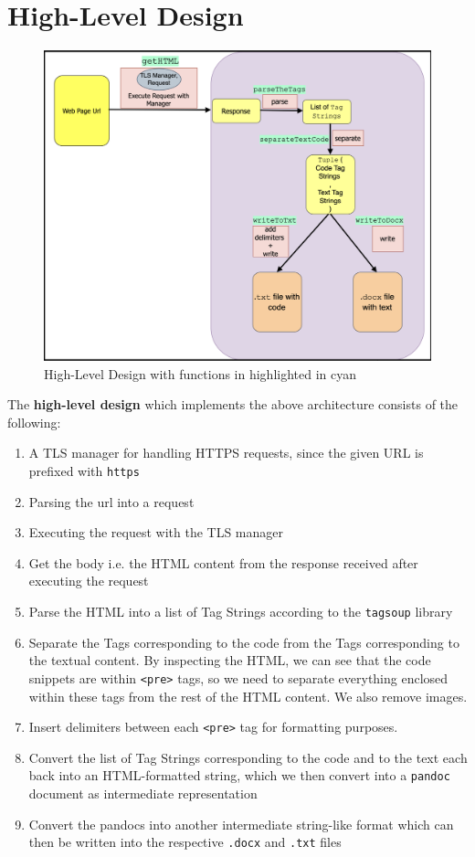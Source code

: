 \documentclass{scrreprt}
\begin{document}
\section{High-Level Design}


\begin{figure}[h]
    \centering
    \includegraphics[width=1.0\textwidth]{figures/high-design.png}
    \caption{High-Level Design with functions in highlighted in cyan}
    \label{fig:high-level-design}
\end{figure}

The \textbf{high-level design} which implements the above architecture consists of the following:
\begin{enumerate}
    \item A TLS manager for handling HTTPS requests, since the given URL is prefixed with \texttt{https}
    \item Parsing the url into a request
    \item Executing the request with the TLS manager
    \item Get the body i.e. the HTML content from the response received after executing the request
    \item Parse the HTML into a list of Tag Strings according to the \texttt{tagsoup} library
    \item Separate the Tags corresponding to the code from the Tags corresponding to the textual content. By inspecting the HTML, we can see that the code snippets are within \texttt{<pre>} tags, so we need to separate everything enclosed within these tags from the rest of the HTML content. We also remove images. 
    \item Insert delimiters between each \texttt{<pre>} tag for formatting purposes. 
    \item Convert the list of Tag Strings corresponding to the code and to the text each back into an HTML-formatted string, which we then convert into a \texttt{pandoc} document as intermediate representation
    \item Convert the pandocs into another intermediate string-like format which can then be written into the respective \texttt{.docx} and \texttt{.txt} files
\end{enumerate}
\end{document}
